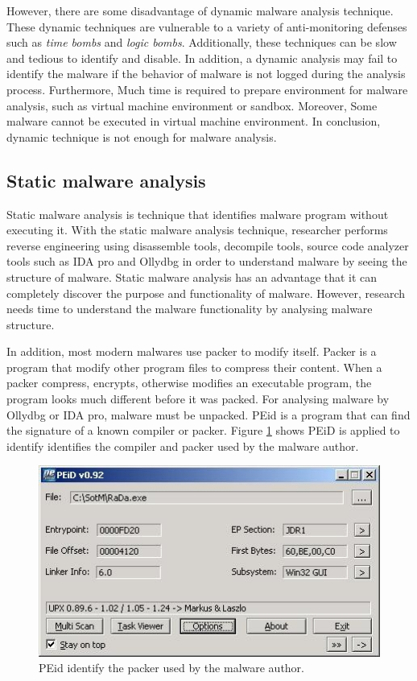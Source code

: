However, there are some disadvantage of dynamic malware analysis technique. These dynamic techniques are vulnerable to a variety of anti-monitoring defenses such as \emph{time bombs} and \emph{logic bombs}. Additionally, these techniques can be slow and tedious to identify and disable. In addition, a dynamic analysis may fail to identify the malware if the behavior of malware is not logged during the analysis process. Furthermore, Much time is required to prepare environment for malware analysis, such as virtual machine environment or sandbox. Moreover, Some malware cannot be executed in virtual machine environment. In conclusion, dynamic technique is not enough for malware analysis. 

\subsection{Static malware analysis}

Static malware analysis is technique that identifies malware program without executing it. With the static malware analysis technique, researcher performs reverse engineering using disassemble tools, decompile tools, source code analyzer tools such as IDA pro and Ollydbg in order to understand malware by seeing the structure of malware. Static malware analysis has an advantage that it can completely discover the purpose and functionality of malware. However, research needs time to understand the malware functionality by analysing malware structure.

In addition, most modern malwares use packer to modify itself. Packer is a program that modify other program files to compress their content. When a packer compress, encrypts, otherwise modifies an executable program, the program looks much different before it was packed. For analysing malware by Ollydbg or IDA pro, malware must be unpacked. PEid is a program that can find the signature of a known compiler or packer. Figure \ref{fig:PEid} shows PEiD is applied to identify identifies the compiler and packer used by the malware author.

\begin{figure}[h!]
\centering
\includegraphics[width=1\textwidth]{graph/PEid.jpg}
\caption{PEid identify the packer used by the malware author.}
\label{fig:PEid}
\end{figure}

